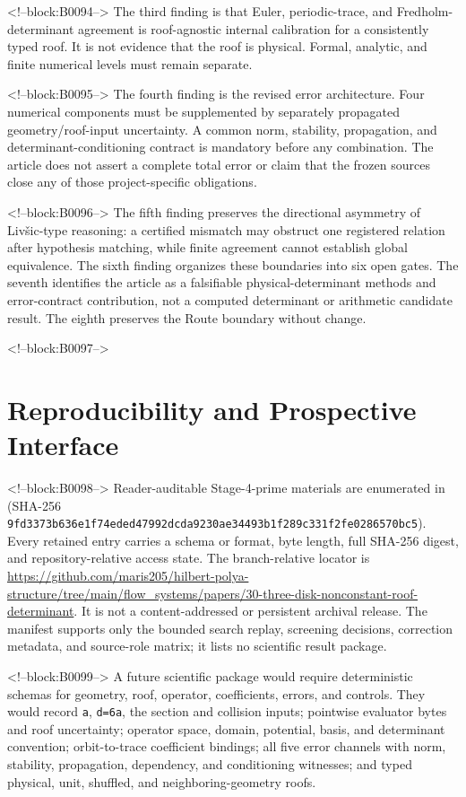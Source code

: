 \documentclass[11pt,a4paper]{article}
\begin{document}
<!--block:B0094-->
The third finding is that Euler, periodic-trace, and Fredholm-determinant agreement is roof-agnostic internal calibration for a consistently typed roof. It is not evidence that the roof is physical. Formal, analytic, and finite numerical levels must remain separate.

<!--block:B0095-->
The fourth finding is the revised error architecture. Four numerical components must be supplemented by separately propagated geometry/roof-input uncertainty. A common norm, stability, propagation, and determinant-conditioning contract is mandatory before any combination. The article does not assert a complete total error or claim that the frozen sources close any of those project-specific obligations.

<!--block:B0096-->
The fifth finding preserves the directional asymmetry of Livšic-type reasoning: a certified mismatch may obstruct one registered relation after hypothesis matching, while finite agreement cannot establish global equivalence. The sixth finding organizes these boundaries into six open gates. The seventh identifies the article as a falsifiable physical-determinant methods and error-contract contribution, not a computed determinant or arithmetic candidate result. The eighth preserves the Route boundary without change.

<!--block:B0097-->
\section{Reproducibility and Prospective Interface}

<!--block:B0098-->
Reader-auditable Stage-4-prime materials are enumerated in
 (SHA-256
\texttt{9fd3373b636e1f74\allowbreak eded47992dcda923\allowbreak 0ae34493b1f289c3\allowbreak 31f2fe0286570bc5}).  Every retained entry carries a schema or format,
byte length, full SHA-256 digest, and repository-relative access state.  The
branch-relative locator is
\url{https://github.com/maris205/hilbert-polya-structure/tree/main/flow_systems/papers/30-three-disk-nonconstant-roof-determinant}.
It is not a content-addressed or persistent archival release.  The manifest
supports only the bounded search replay, screening decisions, correction
metadata, and source-role matrix; it lists no scientific result package.

<!--block:B0099-->
A future scientific package would require deterministic schemas for geometry, roof, operator, coefficients, errors, and controls. They would record \texttt{a}, \texttt{d=6a}, the section and collision inputs; pointwise evaluator bytes and roof uncertainty; operator space, domain, potential, basis, and determinant convention; orbit-to-trace coefficient bindings; all five error channels with norm, stability, propagation, dependency, and conditioning witnesses; and typed physical, unit, shuffled, and neighboring-geometry roofs.
\end{document}
